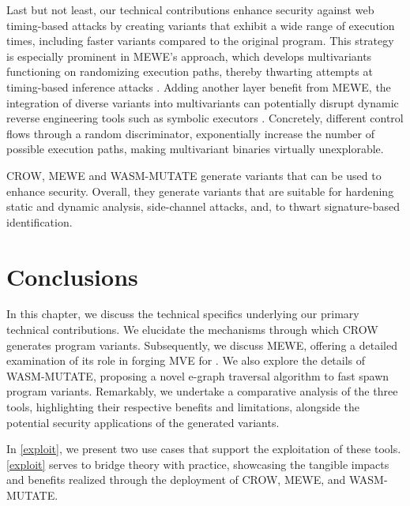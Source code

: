 Last but not least, our technical contributions enhance security against web timing-based attacks \cite{morgan2015web, DBLP:conf/ndss/SchnitzlerKBP23} by creating variants that exhibit a wide range of execution times, including faster variants compared to the original program. 
This strategy is especially prominent in MEWE’s approach, which develops multivariants functioning on randomizing execution paths, thereby thwarting attempts at timing-based inference attacks \cite{DBLP:conf/ndss/SchnitzlerKBP23}. 
Adding another layer benefit from MEWE, the integration of diverse variants into multivariants can potentially disrupt dynamic reverse engineering tools such as symbolic executors \cite{wasmixer}. 
Concretely, different control flows through a random discriminator, exponentially increase the number of possible execution paths, making multivariant binaries virtually unexplorable.


\begin{tcolorbox}[title=Takeaway,boxrule=1pt,arc=.2em,boxsep=1.0mm]
    CROW, MEWE and WASM-MUTATE generate \Wasm variants that can be used to enhance security. 
    Overall, they generate variants that are suitable for hardening static and dynamic analysis, side-channel attacks, and, to thwart signature-based identification. 
\end{tcolorbox}


\section*{Conclusions}

In this chapter, we discuss the technical specifics underlying our primary technical contributions.
We elucidate the mechanisms through which CROW generates program variants.
Subsequently, we discuss MEWE, offering a detailed examination of its role in forging MVE for \Wasm. 
We also explore the details of WASM-MUTATE, proposing a novel e-graph traversal algorithm to fast spawn \wasm program variants. 
Remarkably, we undertake a comparative analysis of the three tools, highlighting their respective benefits and limitations, alongside the potential security applications of the generated \wasm variants. 

In \autoref{exploit}, we present two use cases that support the exploitation of these tools.
\autoref{exploit} serves to bridge theory with practice, showcasing the tangible impacts and benefits realized through the deployment of CROW, MEWE, and WASM-MUTATE.
